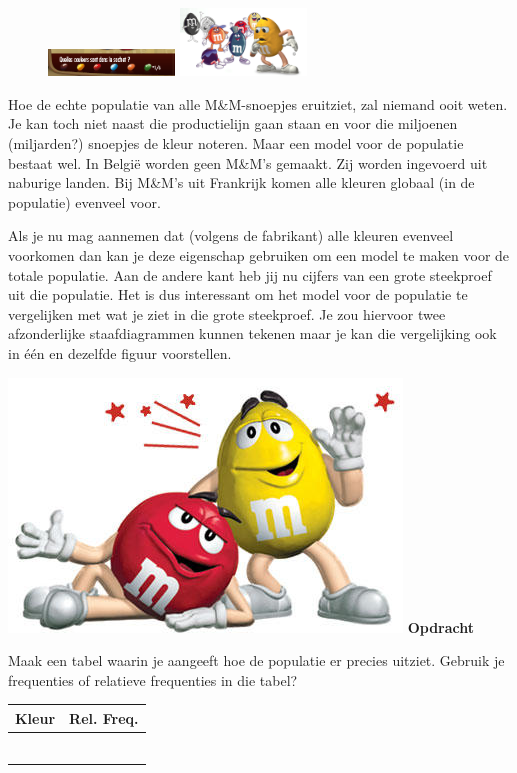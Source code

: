 \documentclass[12pt,twoside]{article}
\newcounter{nmmopdracht}
\newenvironment{mmopdracht}
{
  \stepcounter{nmmopdracht}
  \vspace*{0.7cm}
  \begin{minipage}{\textwidth}
  {%
  \hspace*{-\marginparwidth}\includegraphics[width=\marginparwidth]{mmopdracht}
  \large\bf Opdracht \arabic{nmmopdracht}}
}{%
  \end{minipage}
}
\begin{document}
\begin{figure}
  \vspace{-0.5cm}
  \includegraphics[width=0.3\textwidth]{MenM-uniforme_verdeling}
  \includegraphics[width=0.3\textwidth]{MenM-hoeveel}
\end{figure}
Hoe de echte populatie van alle M\&M-snoepjes eruitziet, zal niemand ooit weten. Je kan toch niet
naast die productielijn gaan staan en voor die miljoenen (miljarden?) snoepjes de kleur noteren.
Maar een model voor de populatie bestaat wel. In België worden geen M\&M’s gemaakt. Zij worden
ingevoerd uit naburige landen. Bij M\&M’s uit Frankrijk komen alle kleuren globaal (in de populatie)
evenveel voor.

Als je nu mag aannemen dat (volgens de fabrikant) alle
kleuren evenveel voorkomen dan kan je deze eigenschap
gebruiken om een model te maken voor de totale
populatie. Aan de andere kant heb jij nu cijfers van een
grote steekproef uit die populatie. Het is dus interessant
om het model voor de populatie te vergelijken met wat je
ziet in die grote steekproef. Je zou hiervoor twee
afzonderlijke staafdiagrammen kunnen tekenen maar je
kan die vergelijking ook in één en dezelfde figuur
voorstellen.

\begin{mmopdracht}
Maak een tabel waarin je aangeeft hoe de populatie er precies uitziet. Gebruik je frequenties
of relatieve frequenties in die tabel?
\begin{center}
  \begin{tabular}{p{2cm}|p{2cm}}
    Kleur&Rel. Freq.\\
    \hline
    &\\
    \hline
    &\\
    \hline
    &\\
    \hline
    &\\
    \hline
    &\\
    \hline
    &\\
  \end{tabular}
\end{center}
\end{mmopdracht}
\end{document}
